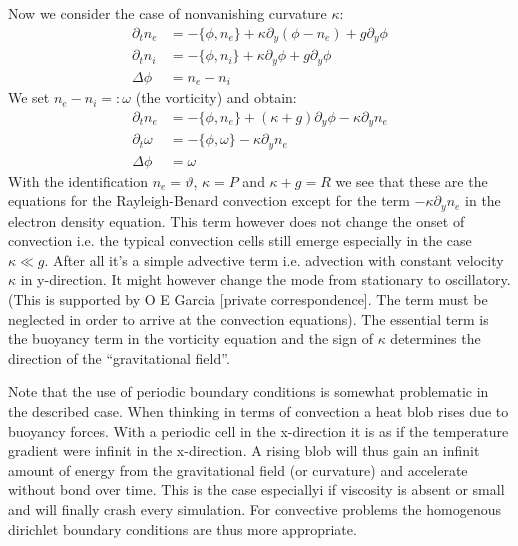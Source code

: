 \documentclass[a4paper,12pt]{scrartcl}
\begin{document}
Now we consider the case of nonvanishing curvature $\kappa$:
\begin{subequations}
\begin{align}
    \partial_t n_e &= -\{\phi,n_e\} +\kappa\partial_y(\phi - n_e)  + g\partial_y\phi \\
    \partial_t n_i &= -\{\phi,n_i\} +\kappa\partial_y\phi  + g\partial_y\phi \\
    \Delta\phi &= n_e - n_i
\end{align}
\label{eq:toefl_pre_rb}
\end{subequations}
We set $n_e - n_i =: \omega$ (the vorticity) and obtain:
\begin{subequations}
\begin{align}
    \partial_t n_e &= -\{\phi,n_e\} +(\kappa+g)\partial_y\phi - \kappa\partial_y n_e \\
    \partial_t \omega &=-\{\phi, \omega\} -\kappa \partial_y n_e \\
    \Delta\phi &= \omega 
\end{align}
\label{eq:toefl_rb}
\end{subequations}
With the identification $n_e = \vartheta$, $\kappa = P$ and $\kappa+g=R$ we see that these are
the equations for the Rayleigh-Benard convection except for the term 
$-\kappa\partial_y n_e$
in the electron density equation. 
This term however does not change the onset of convection i.e. the 
typical convection cells still emerge especially in the case $\kappa \ll g$. 
After all it's a simple advective term 
i.e. advection with constant velocity $\kappa$ in y-direction. It might
however change the mode from stationary to oscillatory. (This is
supported by O E Garcia [private correspondence]. The term must be neglected
in order to arrive at the convection equations).
The essential term is the buoyancy term in the vorticity equation and the
sign of $\kappa$ determines the direction of the ``gravitational field''. 

Note that the use of periodic boundary conditions is somewhat problematic in 
the described case. When thinking in terms of convection a heat blob rises due to
buoyancy forces. With a periodic cell in the x-direction it is as if the 
temperature gradient were infinit in the x-direction. A rising blob will thus
gain an infinit amount of energy from the gravitational field (or curvature)
and accelerate without bond over time. 
This is the case especiallyi if viscosity is absent or small and will finally 
crash every simulation.
For convective problems the homogenous dirichlet boundary conditions are thus more 
appropriate.
\end{document}
